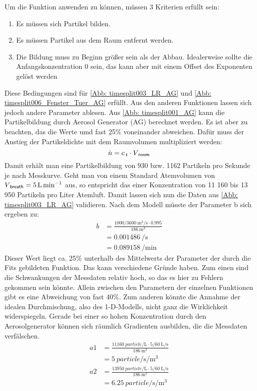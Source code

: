 \documentclass[12pt,a4paper,bibtotocnumbered,liststotocnumbered]{scrreprt}
\begin{document}
Um die Funktion anwenden zu können, müssen 3 Kriterien erfüllt sein:
\begin{enumerate}
\item Es müssen sich Partikel bilden.
\item Es müssen Partikel aus dem Raum entfernt werden.
\item Die Bildung muss zu Beginn größer sein als der Abbau. Idealerweise sollte die Anfangskonzentration 0 sein, das kann aber mit einem Offset des Exponenten gelöst werden
\end{enumerate}
Diese Bedingungen sind für \autoref{Abb: timesplit003_LR_AG} und \ref{Abb: timesplit006_Fenster_Tuer_AG} erfüllt.
Aus den anderen Funktionen lassen sich jedoch andere Parameter ablesen. Aus \autoref{Abb: timesplit001_AG} kann die Partikelbildung durch Aerosol Generator (AG) berechnet werden. Es ist aber zu beachten, das die Werte umd fast 25\% voneinander abweichen. Dafür muss der Anstieg der Partikeldichte mit dem Raumvolumen multipliziert werden:
\begin{equation}
\dot{n} = c_{\: \mathsf{t}} \cdot V_{\: \mathsf{room}} 
\end{equation}
Damit erhält man eine Partikelbildung von 930 bzw. 1162 Partikeln pro Sekunde je nach Messkurve. Geht man von einem Standard Atemvolumen von $V_{\: \mathsf{breath}} = \SI{5}{\liter\per\minute}$  aus, so entspricht das einer Konzentration von 11 160 bis 13 950 Partikeln pro Liter Atemluft. 
Damit lassen sich nun die Daten aus \autoref{Abb: timesplit003_LR_AG} validieren. Nach dem Modell müsste der Parameter b sich ergeben zu:
\begin{align}
b &= \frac{1000/\SI{3600}{\cubic\meter\per\second}   \cdot  0.995}{\SI{186}{\cubic\meter}}\\
&= \SI{0.001486}{\per\second} \\
&= \SI{0.089158}{\per\minute}
\end{align}
Dieser Wert liegt ca. 25\% unterhalb des Mittelwerts der Parameter der durch die Fits gebildeten Funktion. Das kann verschiedene Gründe haben. Zum einen sind die Schwankungen der Messdaten relativ hoch, so das es hier zu Fehlern gekommen sein könnte. Allein zwischen den Parametern der einzelnen Funktionen gibt es eine Abweichung von fast 40\%. Zum anderen könnte die Annahme der idealen Durchmischung, also des 1-D-Modells, nicht ganz die Wirklichkeit widerspiegeln. Gerade bei einer so hohen Konzentration durch den Aerosolgenerator können sich räumlich Gradienten ausbilden, die die Messdaten verfälschen.
\begin{align}
a1 &= \frac{\SI{11160}{particle\per\liter}   \cdot   5/\SI{60}{\liter\per\second}}{\SI{186}{\cubic\meter}}\\
&= \SI{5}{particle\per\second\per\cubic\meter} \\
a2 &= \frac{\SI{13950}{particle\per\liter}   \cdot   5/\SI{60}{\liter\per\second}}{\SI{186}{\cubic\meter}}\\
&= \SI{6.25}{particle\per\second\per\cubic\meter} \\
\end{align}
\end{document}
